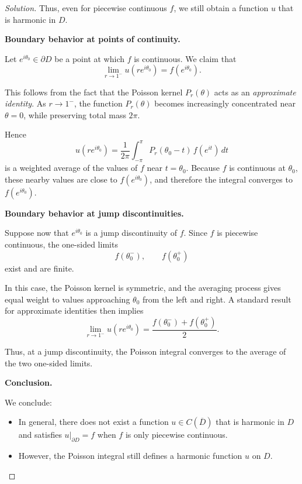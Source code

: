 \documentclass[12pt, a4paper]{report}
\theoremstyle{spaced}
\begin{document}
\begin{proof}[Solution]
	Thus, even for piecewise continuous $f$, we still obtain a function $u$ that is harmonic in $D$.

	\medskip

	\noindent
	\textbf{Boundary behavior at points of continuity.}

	Let $e^{i\theta_0}\in\partial D$ be a point at which $f$ is continuous. We claim that
	\[
		\lim_{r\to 1^-} u(re^{i\theta_0})=f(e^{i\theta_0}).
	\]

	This follows from the fact that the Poisson kernel $P_r(\theta)$ acts as an \emph{approximate identity}. As $r\to 1^-$, the function $P_r(\theta)$ becomes increasingly concentrated near $\theta=0$, while preserving total mass $2\pi$.

	Hence
	\[
		u(re^{i\theta_0})
		=
		\frac{1}{2\pi}\int_{-\pi}^{\pi} P_r(\theta_0-t)\,f(e^{it})\,dt
	\]
	is a weighted average of the values of $f$ near $t=\theta_0$. Because $f$ is continuous at $\theta_0$, these nearby values are close to $f(e^{i\theta_0})$, and therefore the integral converges to $f(e^{i\theta_0})$.

	\medskip

	\noindent
	\textbf{Boundary behavior at jump discontinuities.}

	Suppose now that $e^{i\theta_0}$ is a jump discontinuity of $f$. Since $f$ is piecewise continuous, the one-sided limits
	\[
		f(\theta_0^-),\qquad f(\theta_0^+)
	\]
	exist and are finite.

	In this case, the Poisson kernel is symmetric, and the averaging process gives equal weight to values approaching $\theta_0$ from the left and right. A standard result for approximate identities then implies
	\[
		\lim_{r\to 1^-} u(re^{i\theta_0})
		=
		\frac{f(\theta_0^-)+f(\theta_0^+)}{2}.
	\]

	Thus, at a jump discontinuity, the Poisson integral converges to the average of the two one-sided limits.

	\medskip

	\noindent
	\textbf{Conclusion.}

	We conclude:

	\begin{itemize}
		\item In general, there does not exist a function $u\in C(\overline D)$ that is harmonic in $D$ and satisfies $u|_{\partial D}=f$ when $f$ is only piecewise continuous.

		\item However, the Poisson integral still defines a harmonic function $u$ on $D$.


\end{itemize}
\end{proof}
\end{document}
